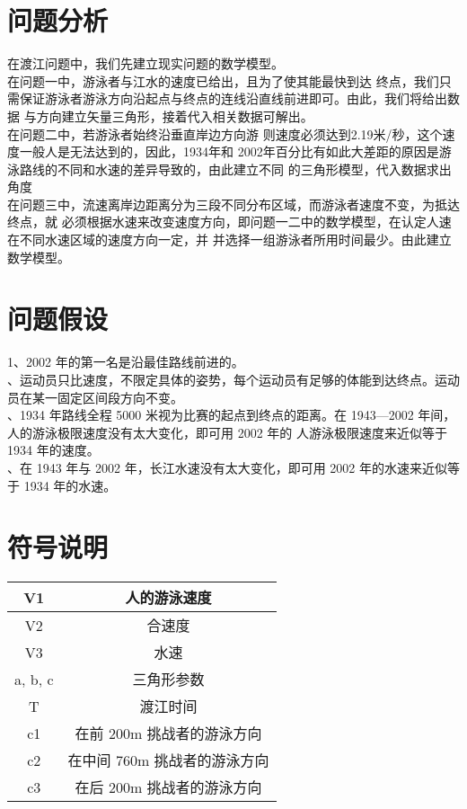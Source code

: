 \documentclass{article}
\begin{document}
\section{问题分析}
在渡江问题中，我们先建立现实问题的数学模型。
\\ \indent 在问题一中，游泳者与江水的速度已给出，且为了使其能最快到达
终点，我们只需保证游泳者游泳方向沿起点与终点的连线沿直线前进即可。由此，我们将给出数据
与方向建立矢量三角形，接着代入相关数据可解出。
\\ \indent 在问题二中，若游泳者始终沿垂直岸边方向游
则速度必须达到2.19米/秒，这个速度一般人是无法达到的，因此，1934年和
2002年百分比有如此大差距的原因是游泳路线的不同和水速的差异导致的，由此建立不同
的三角形模型，代入数据求出角度
\\ \indent 在问题三中，流速离岸边距离分为三段不同分布区域，而游泳者速度不变，为抵达终点，就
必须根据水速来改变速度方向，即问题一二中的数学模型，在认定人速在不同水速区域的速度方向一定，并
并选择一组游泳者所用时间最少。由此建立数学模型。
\section{问题假设}
1、2002 年的第一名是沿最佳路线前进的。
\\ 、运动员只比速度，不限定具体的姿势，每个运动员有足够的体能到达终点。运动员在某一固定区间段方向不变。
\\ 、1934 年路线全程 5000 米视为比赛的起点到终点的距离。在 1943—2002 年间，人的游泳极限速度没有太大变化，即可用 2002 年的
人游泳极限速度来近似等于 1934 年的速度。
\\ 、在 1943 年与 2002 年，长江水速没有太大变化，即可用 2002 年的水速来近似等于 1934 年的水速。
\section{符号说明}
\begin{tabular}{|c|c|}
    \hline
    V1   &  人的游泳速度 \\
    \hline 
    V2 &合速度  \\
    \hline
    V3 &水速  \\
    \hline  
    a, b, c &三角形参数                       \\
    \hline
    T &渡江时间 \\
    \hline
    c1 &在前 200m 挑战者的游泳方向\\
    \hline
    c2 &在中间 760m 挑战者的游泳方向\\
    \hline
    c3 &在后 200m 挑战者的游泳方向  \\
    \hline
\end{tabular}
\end{document}
